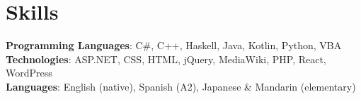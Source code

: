 \section{Skills}
\begin{itemize}[leftmargin=0.15in, label={}]
\small{\item{
    \textbf{Programming Languages}{: C\#, C++, Haskell, Java, Kotlin, Python, VBA} \\
    \textbf{Technologies}{: ASP.NET, CSS, HTML, jQuery, MediaWiki, PHP, React, WordPress} \\
    \textbf{Languages}{: English (native), Spanish (A2), Japanese \& Mandarin (elementary)} \\
}}
\end{itemize}